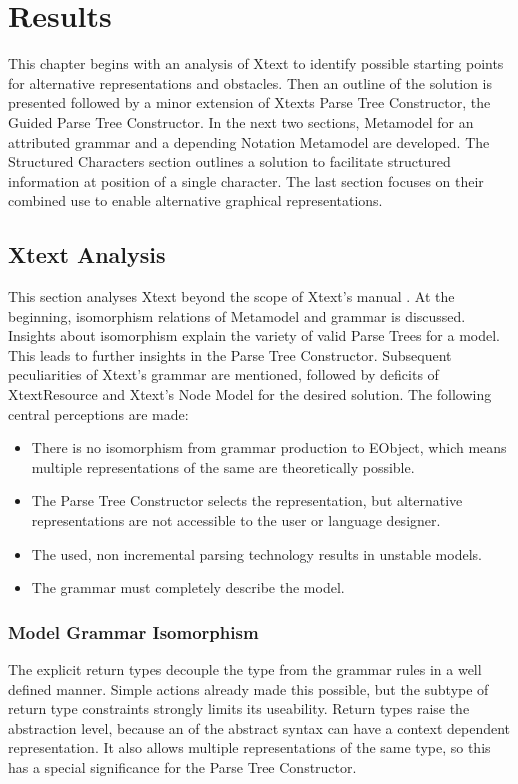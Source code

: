 \chapter{Results}
This chapter begins with an analysis of Xtext to identify possible starting points for alternative representations and obstacles. Then an outline of the solution is presented followed by a minor extension of Xtexts Parse Tree Constructor, the Guided Parse Tree Constructor. In the next two sections, Metamodel for an attributed grammar and a depending Notation Metamodel are developed. The Structured Characters section outlines a solution to facilitate structured information at position of a single character. The last section focuses on their combined use to enable alternative graphical representations.

\section{Xtext Analysis}
This section analyses Xtext beyond the scope of Xtext's manual \cite{XTextMan}. At the beginning, isomorphism relations of Metamodel and grammar is discussed. Insights about isomorphism explain the variety of valid Parse Trees for a model. This leads to further insights in the Parse Tree Constructor. Subsequent peculiarities of Xtext's grammar are mentioned, followed by deficits of XtextResource and Xtext's Node Model for the desired solution.
The following central perceptions are made:
\begin{itemize}
	\item There is no isomorphism from grammar production to EObject, which means multiple representations of the same  are theoretically possible.
	\item The Parse Tree Constructor selects the representation, but alternative representations are not accessible to the user or language designer.
	\item The used, non incremental parsing technology results in unstable models.
	\item The grammar must completely describe the model.
\end{itemize}

\subsection{Model Grammar Isomorphism} \label{sec:isomorph}
The explicit return types decouple the  type from the grammar rules in a well defined manner. Simple actions already made this possible, but the subtype of return type constraints strongly limits its useability. Return types raise the abstraction level, because an  of the abstract syntax can have a context dependent representation. It also allows multiple representations of the same  type, so this has a special significance for the Parse Tree Constructor.

